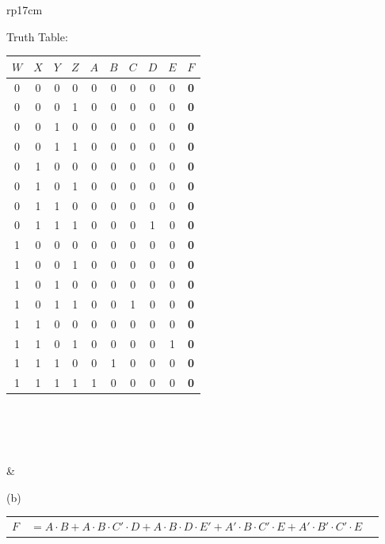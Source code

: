 \documentclass{article}
\begin{document}
\begin{longtable}[l]{rp{17cm}}
\begin{minipage}[t]{\linewidth}
Truth Table:\\
\begin{tabular}{cccc|ccccc|c}
  $W$ & $X$ & $Y$ & $Z$ & $A$ & $B$ & $C$ & $D$ & $E$ & \textbf{$F$}\\
  \hline
   0  &  0  &  0  &  0  &  0  &  0  &  0  &  0  &  0  & \textbf{ 0 }\\
   0  &  0  &  0  &  1  &  0  &  0  &  0  &  0  &  0  & \textbf{ 0 }\\
   0  &  0  &  1  &  0  &  0  &  0  &  0  &  0  &  0  & \textbf{ 0 }\\
   0  &  0  &  1  &  1  &  0  &  0  &  0  &  0  &  0  & \textbf{ 0 }\\
   0  &  1  &  0  &  0  &  0  &  0  &  0  &  0  &  0  & \textbf{ 0 }\\
   0  &  1  &  0  &  1  &  0  &  0  &  0  &  0  &  0  & \textbf{ 0 }\\
   0  &  1  &  1  &  0  &  0  &  0  &  0  &  0  &  0  & \textbf{ 0 }\\
   0  &  1  &  1  &  1  &  0  &  0  &  0  &  1  &  0  & \textbf{ 0 }\\
   1  &  0  &  0  &  0  &  0  &  0  &  0  &  0  &  0  & \textbf{ 0 }\\
   1  &  0  &  0  &  1  &  0  &  0  &  0  &  0  &  0  & \textbf{ 0 }\\
   1  &  0  &  1  &  0  &  0  &  0  &  0  &  0  &  0  & \textbf{ 0 }\\
   1  &  0  &  1  &  1  &  0  &  0  &  1  &  0  &  0  & \textbf{ 0 }\\
   1  &  1  &  0  &  0  &  0  &  0  &  0  &  0  &  0  & \textbf{ 0 }\\
   1  &  1  &  0  &  1  &  0  &  0  &  0  &  0  &  1  & \textbf{ 0 }\\
   1  &  1  &  1  &  0  &  0  &  1  &  0  &  0  &  0  & \textbf{ 0 }\\
   1  &  1  &  1  &  1  &  1  &  0  &  0  &  0  &  0  & \textbf{ 0 }\\
\end{tabular}\\ \\
\end{minipage}\\
&\begin{minipage}[t]{\linewidth}
(b)\\
\begin{tabular}{rll}
  $F$ & $=A \cdot B + A \cdot B \cdot C' \cdot D + A \cdot B \cdot D \cdot E' + A' \cdot B \cdot C' \cdot E + A' \cdot B' \cdot C' \cdot E$ &\\

\end{tabular}
\end{minipage}
\end{longtable}
\end{document}
